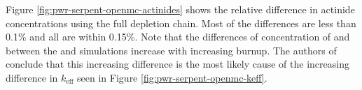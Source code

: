 Figure \ref{fig:pwr-serpent-openmc-actinides} shows the relative difference in
actinide concentrations using the full depletion chain. Most of the differences
are less than 0.1\% and all are within 0.15\%. Note that the differences of concentration of 
 and  between the \OpenMC and \SerpentTWO simulations increase
with increasing burnup. The authors of \cite{romano_depletion_2021} conclude that this
increasing difference is the most likely cause of the increasing difference
in $k_{\text{eff}}$ seen in Figure \ref{fig:pwr-serpent-openmc-keff}.

\begin{figure}[htpb]
    \centering
\end{figure}
